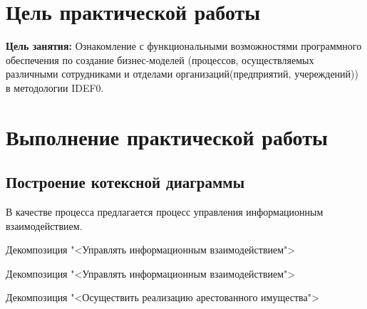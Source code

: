 \graphicspath{{./fourth/img/}}

\section{Цель практической работы}
\textbf{Цель занятия:}
Ознакомление с функциональными возможностями программного обеспечения
по создание бизнес-моделей (процессов, осуществляемых различными сотрудниками
и отделами организаций(предприятий, учереждений)) в методологии IDEF0.\par

\section{Выполнение практической работы}
\subsection{Построение котексной диаграммы}
В качестве процесса предлагается процесс управления
информационным взаимодействием.

\begin{image}
	\caption{Декомпозиция "<Управлять информационным взаимодействием">}
	\label{fig:IDEF0:a0}
\end{image}

\begin{image}
	\caption{Декомпозиция "<Управлять информационным взаимодействием">}
	\label{fig:IDEF0:a0:d}
\end{image}

\begin{image}
	\caption{Декомпозиция "<Осуществить реализацию арестованного имущества">}
	\label{fig:IDEF0:a4}
\end{image}

